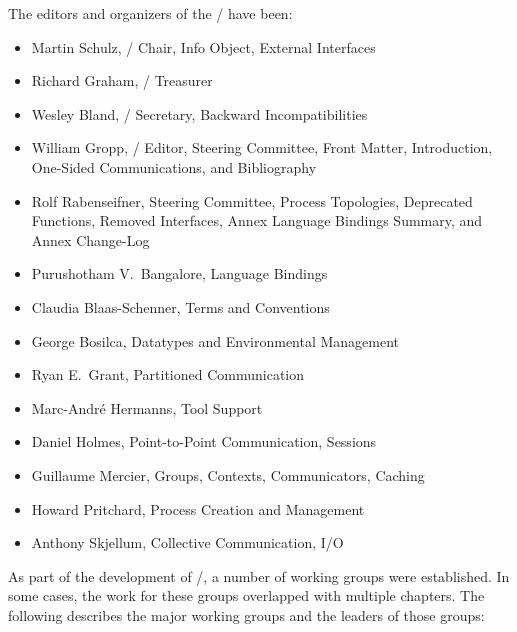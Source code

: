 \noindent The editors and organizers of the \MPIIVDOTO/ have been:
\begin{itemize}
\item Martin Schulz, \MPIIVDOTO/ Chair, Info Object, External Interfaces
\item Richard Graham, \MPIIVDOTO/ Treasurer
\item Wesley Bland, \MPIIVDOTO/ Secretary, Backward Incompatibilities
\item William Gropp, \MPIIVDOTO/ Editor, Steering Committee, Front Matter,
      Introduction, One-Sided Communications, and Bibliography
\item Rolf Rabenseifner, Steering Committee,
  Process Topologies, Deprecated Functions, Removed Interfaces,
  Annex Language Bindings Summary, and Annex Change-Log

\item Purushotham V.~Bangalore, Language Bindings
\item Claudia Blaas-Schenner, Terms and Conventions
\item George Bosilca, Datatypes and Environmental Management
\item Ryan E.~Grant, Partitioned Communication
\item Marc-Andr\'e Hermanns, Tool Support
\item Daniel Holmes, Point-to-Point Communication, Sessions
\item Guillaume Mercier, Groups, Contexts, Communicators, Caching
\item Howard Pritchard, Process Creation and Management
\item Anthony Skjellum, Collective Communication, I/O
\end{itemize}



\noindent As part of the development of \MPIIVDOTO/, a number of
working groups were established.
In some cases, the work for these groups overlapped with multiple
chapters.
The following describes the major working groups and the leaders of
those groups:

